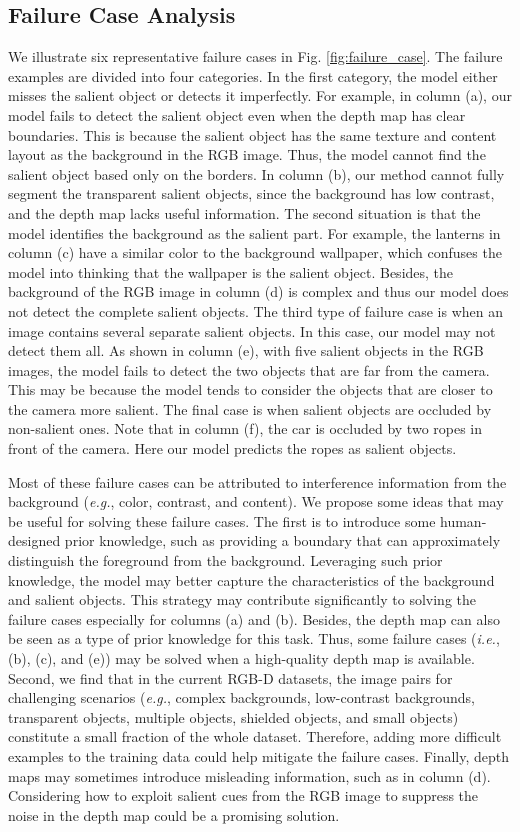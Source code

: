 \documentclass[journal]{IEEEtran}
\newcommand{\figref}[1]{Fig. \ref{#1}}
\def\ie{\emph{i.e.}}
\def\eg{\emph{e.g.}}
\begin{document}
\subsection{Failure Case Analysis}\label{sec:failure_cases}
We illustrate six representative failure cases in \figref{fig:failure_case}.
The failure examples are divided into four categories.
In the first category, the model either misses the salient object or detects it imperfectly.
For example, in column (a), our model fails to detect the salient object even when the depth map has clear boundaries.
This is because the salient object has the same texture and content layout as the background in the RGB image. Thus, the model cannot find the salient object based only on the borders.
In column (b), our method cannot fully segment the transparent salient objects, since the background has low contrast, and the depth map lacks useful information.
The second situation is that the model identifies the background as the salient part.
For example, the lanterns in column (c) have a similar color to the background wallpaper, which confuses the model into thinking that the wallpaper is the salient object. 
Besides, the background of the RGB image in column (d) is complex and thus our model does not detect the complete salient objects.
The third type of failure case is when an image contains several separate salient objects. In this case, our model may not detect them all.
As shown in column (e), with five salient objects in the RGB images, the model fails to detect the two objects that are far from the camera.
This may be because the model tends to consider the objects that are closer to the camera more salient.
The final case is when salient objects are occluded by non-salient ones.
Note that in column (f), the car is occluded by two ropes in front of the camera. Here our model predicts the ropes as salient objects.\par
Most of these failure cases can be attributed to interference information from the background (\eg, color, contrast, and content).
We propose some ideas that may be useful for solving these failure cases.
The first is to introduce some human-designed prior knowledge, such as providing a boundary that can approximately distinguish the foreground from the background.
Leveraging such prior knowledge, the model may better capture the characteristics of the background and salient objects.
This strategy may contribute significantly to solving the failure cases especially for columns (a) and (b).
Besides, the depth map can also be seen as a type of prior knowledge for this task.
Thus, some failure cases (\ie, (b), (c), and (e)) may be solved when a high-quality depth map is available.
Second, we find that in the current RGB-D datasets, the image pairs for challenging scenarios (\eg, complex backgrounds, low-contrast backgrounds, transparent objects, multiple objects, shielded objects, and small objects) constitute a small fraction of the whole dataset.
Therefore, adding more difficult examples to the training data could help mitigate the failure cases.
Finally, depth maps may sometimes introduce misleading information, such as in column (d).
Considering how to exploit salient cues from the RGB image to suppress the noise in the depth map could be a promising solution.
\end{document}

